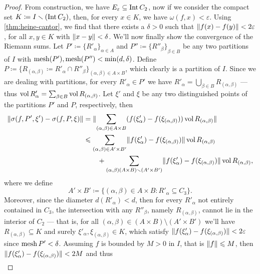 \begin{proof}
From construction, we have \(E_{\varepsilon} \subseteq \operatorname{Int} C_2\), now if we
consider the compact set \(K \coloneq I \smallsetminus (\operatorname{Int} C_2)\), then, for every
\(x \in K\), we have \(\omega(f, x) < \varepsilon\). Using
\cref{thm:heine-cantor}, we find that there exists a \(\delta > 0\) such that
\(\lVert f(x) - f(y)\rVert < 2 \varepsilon\), for all \(x, y \in K\) with \(\lVert x -
y\rVert < \delta\). We'll now finally show the convergence of the Riemann sums. Let
\(P' \coloneq {\{R'_{\alpha}\}}_{\alpha \in A}\) and \(P'' \coloneq
{\{R''_{\beta}\}}_{\beta \in B}\) be any two partitions of \(I\) with \(\operatorname{mesh}(P'),
\operatorname{mesh}(P'') < \min(d, \delta)\). Define \(P \coloneq \{R_{(\alpha, \beta)}
\coloneq R'_{\alpha} \cap R''_{\beta}\}_{(\alpha, \beta) \in A \times B}\),
which clearly is a partition of \(I\). Since we are dealing with partitions,
for every \(R'_{\alpha} \in P'\) we have \(R'_{\alpha} = \bigcup_{\beta \in
B} R_{(\alpha, \beta)}\) --- thus \(\operatorname{vol} R'_{\alpha} = \sum_{\beta \in B} \operatorname{vol}
R_{(\alpha, \beta)}\). Let \(\xi'\) and \(\xi\) be any two distinguished points
of the partitions \(P'\) and \(P\), respectively, then
\begin{align*}
  \lVert\sigma(f, P', \xi') - \sigma(f, P, \xi)\rVert
  &= \lVert\sum_{(\alpha, \beta) \in A \times B} (f(\xi'_{\alpha}) -
    f(\xi_{(\alpha, \beta)})) \operatorname{vol} R_{(\alpha, \beta)}\rVert \\
  &\leqslant \sum_{(\alpha, \beta) \in A' \times B'}
    \lVert f(\xi'_{\alpha}) - f(\xi_{(\alpha, \beta)})\rVert \operatorname{vol} R_{(\alpha, \beta)} \\
  &\qquad+  \sum_{(\alpha, \beta) (A \times B) \smallsetminus (A' \times B')}
  \lVert f(\xi'_{\alpha}) - f(\xi_{(\alpha, \beta)})\rVert \operatorname{vol} R_{(\alpha, \beta)},
\end{align*}
where we define
\[
  A' \times B' \coloneq
  \{(\alpha, \beta) \in A \times B : R'_{\alpha} \subseteq C_3\}.
\]
Moreover, since the diameter \(d(R'_{\alpha}) < d\), then for every
\(R'_{\alpha}\) not entirely contained in \(C_3\), the intersection with any
\(R''_{\beta}\), namely \(R_{(\alpha, \beta)}\), cannot lie in the interior of
\(C_2\) --- that is, for all \((\alpha, \beta) \in (A \times B) \setminus (A'
\times B')\) we'll have \(R_{(\alpha, \beta)} \subseteq K\) and surely
\(\xi'_{\alpha}, \xi_{(\alpha, \beta)} \in K\), which satisfy
\(\lVert f(\xi'_{\alpha}) - f(\xi_{(\alpha, \beta)})\rVert < 2 \varepsilon\) since
\(\operatorname{mesh} P' < \delta\). Assuming \(f\) is bounded by \(M > 0\) in \(I\), that is
\(\lVert f\rVert \leqslant M\), then \(\lVert f(\xi'_{\alpha}) - f(\xi_{(\alpha, \beta)})\rVert <
2 M\) and thus
\begin{align*}

\end{align*}
\end{proof}
